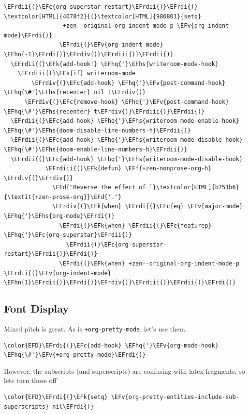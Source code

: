 \documentclass{scrartcl}
\newcommand{\EFk}[1]{\textcolor{EFk}{#1}} %
\newcommand{\EFd}[1]{\textcolor{EFd}{\textit{#1}}} %
\newcommand{\EFc}[1]{\textcolor{EFc}{#1}} %
\newcommand{\EFv}[1]{\textcolor{EFv}{#1}} %
\newcommand{\EFf}[1]{\textcolor{EFf}{#1}} %
\newcommand{\EFhn}[1]{\textcolor{EFhn}{\textbf{#1}}} %
\newcommand{\EFhq}[1]{\textcolor{EFhq}{#1}} %
\newcommand{\EFhs}[1]{\textcolor{EFhs}{#1}} %
\newcommand{\EFrdi}[1]{\textcolor{EFrdi}{#1}} %
\newcommand{\EFrdii}[1]{\textcolor{EFrdii}{#1}} %
\newcommand{\EFrdiii}[1]{\textcolor{EFrdiii}{#1}} %
\newcommand{\EFrdiv}[1]{\textcolor{EFrdiv}{#1}} %
\begin{document}
\begin{Code}
\begin{Verbatim}[]
                  \EFrdii{(}\EFc{org-superstar-restart}\EFrdii{)}\EFrdi{)}               \textcolor[HTML]{4078f2}{(}\textcolor[HTML]{986801}{setq}
                 +zen--original-org-indent-mode-p \EFv{org-indent-mode}\EFrdi{)}
                \EFrdi{(}\EFv{org-indent-mode} \EFhn{-1}\EFrdi{)}\EFrdiv{)}\EFrdiii{)}\EFrdii{)}
  \EFrdii{(}\EFk{add-hook!} \EFhq{'}\EFhs{writeroom-mode-hook}
    \EFrdiii{(}\EFk{if} writeroom-mode
        \EFrdiv{(}\EFc{add-hook} \EFhq{'}\EFv{post-command-hook} \EFhq{\#'}\EFhs{recenter} nil t\EFrdiv{)}
      \EFrdiv{(}\EFc{remove-hook} \EFhq{'}\EFv{post-command-hook} \EFhq{\#'}\EFhs{recenter} t\EFrdiv{)}\EFrdiii{)}\EFrdii{)}
  \EFrdii{(}\EFc{add-hook} \EFhq{'}\EFhs{writeroom-mode-enable-hook} \EFhq{\#'}\EFhs{doom-disable-line-numbers-h}\EFrdii{)}
  \EFrdii{(}\EFc{add-hook} \EFhq{'}\EFhs{writeroom-mode-disable-hook} \EFhq{\#'}\EFhs{doom-enable-line-numbers-h}\EFrdii{)}
  \EFrdii{(}\EFc{add-hook} \EFhq{'}\EFhs{writeroom-mode-disable-hook}
            \EFrdiii{(}\EFk{defun} \EFf{+zen-nonprose-org-h} \EFrdiv{(}\EFrdiv{)}
              \EFd{"Reverse the effect of `}\textcolor[HTML]{b751b6}{\textit{+zen-prose-org}}\EFd{'."}
              \EFrdiv{(}\EFk{when} \EFrdi{(}\EFc{eq} \EFv{major-mode} \EFhq{'}\EFhs{org-mode}\EFrdi{)}
                \EFrdi{(}\EFk{when} \EFrdii{(}\EFc{featurep} \EFhq{'}\EFc{org-superstar}\EFrdii{)}
                  \EFrdii{(}\EFc{org-superstar-restart}\EFrdii{)}\EFrdi{)}
                \EFrdi{(}\EFk{when} +zen--original-org-indent-mode-p \EFrdii{(}\EFv{org-indent-mode} \EFhn{1}\EFrdii{)}\EFrdi{)}\EFrdiv{)}\EFrdiii{)}\EFrdii{)}\EFrdi{)}
\end{Verbatim}
\end{Code}

\subsection{Font Display}
\label{sec:org9209064}
Mixed pitch is great. As is \texttt{+org-pretty-mode}, let's use them.
\begin{Code}
\begin{Verbatim}[]
\color{EFD}\EFrdi{(}\EFc{add-hook} \EFhq{'}\EFv{org-mode-hook} \EFhq{\#'}\EFv{+org-pretty-mode}\EFrdi{)}
\end{Verbatim}
\end{Code}

However, the subscripts (and superscripts) are confusing with latex fragments,
so lets turn those off
\begin{Code}
\begin{Verbatim}[]
\color{EFD}\EFrdi{(}\EFk{setq} \EFv{org-pretty-entities-include-sub-superscripts} nil\EFrdi{)}
\end{Verbatim}
\end{Code}
\end{document}
